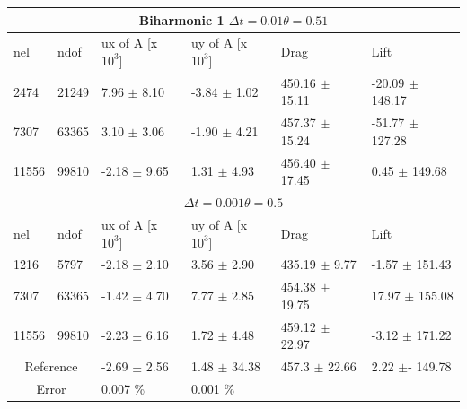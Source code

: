\begin{table}[h!]
\centering
\label{my-label}
\begin{tabular}{ |p{0.9cm}||p{0.9cm}|p{2.49cm}|p{2.49cm}|p{2.6cm}|p{2.8cm}|}
 \hline
  \multicolumn{6}{|c|}{Biharmonic 1 \hspace{2mm}  $\Delta t = 0.01 \theta = 0.51$} \\
   \hline
nel & ndof & ux of A [x $10^{3}$]  &uy of A [x $10^{3}$]& Drag  & Lift \\
 \hline
 2474     &21249  &7.96  $\pm$ 8.10  &  -3.84   $\pm$ 1.02 & 450.16  $\pm$ 15.11  & -20.09 $\pm$ 148.17 \\
 7307    & 63365  & 3.10  $\pm$ 3.06  & -1.90   $\pm$ 4.21 & 457.37  $\pm$ 15.24 & -51.77 $\pm$ 127.28 \\
 11556   & 99810  & -2.18  $\pm$ 9.65 & 1.31    $\pm$ 4.93  & 456.40 $\pm$ 17.45 &  0.45 $\pm$ 149.68  \\
 \hline
  \multicolumn{6}{|c|}{$\Delta t = 0.001 \theta = 0.5$} \\
   \hline
 nel & ndof & ux of A [x $10^{3}$]  &uy of A [x $10^{3}$]& Drag  & Lift \\
1216 &5797  & -2.18       $\pm$ 2.10 & 3.56   $\pm$ 2.90 & 435.19       $\pm$ 9.77  & -1.57       $\pm$ 151.43 \\
7307    & 63365  & -1.42  $\pm$ 4.70 & 7.77   $\pm$ 2.85 & 454.38       $\pm$ 19.75 & 17.97       $\pm$ 155.08 \\
11556   & 99810  & -2.23  $\pm$ 6.16 & 1.72   $\pm$ 4.48 & 459.12       $\pm$ 22.97 & -3.12       $\pm$ 171.22 \\
 \hline
 \multicolumn{2}{|c|}{Reference} & -2.69 $\pm$  2.56                    & 1.48  $\pm$  34.38                   & 457.3  $\pm$  22.66        & 2.22  $\pm$- 149.78           \\
 \hline
 \multicolumn{2}{|c|}{Error}  & 0.007 \%   & 0.001 \% & &\\
 \hline
\end{tabular}
\end{table}

